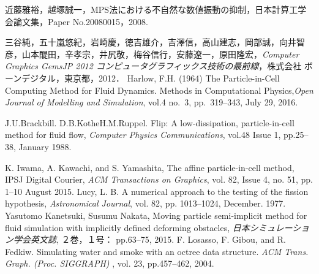 \documentclass[a4j,12pt]{jreport}
\begin{document}
\begin{thebibliography}{99}

近藤雅裕，越塚誠一，MPS法における不自然な数値振動の抑制，日本計算工学会論文集，Paper No.20080015，2008. 

三谷純，五十嵐悠紀，岩崎慶，徳吉雄介，吉澤信，高山建志，岡部誠，向井智彦，山本醍田，辛孝宗，井尻敬，梅谷信行，安藤遼一，原田隆宏，\textit{Computer Graphics GemsJP 2012 コンピュータグラフィックス技術の最前線}，株式会社 ボーンデジタル，東京都，2012．
Harlow, F.H.  (1964) The Particle-in-Cell Computing Method for Fluid Dynamics. Methods in Computational Physics,\textit{Open Journal of Modelling and Simulation},  vol.4 no.~3, pp.~319--343, July 29, 2016.

J.U.Brackbill. D.B.KotheH.M.Ruppel. Flip: A low-dissipation, particle-in-cell method for fluid flow, \textit{Computer Physics Communications}, vol.48 Issue 1, pp.25--38, January 1988.

K. Iwama, A. Kawachi, and S. Yamashita, The affine particle-in-cell method, IPSJ Digital Courier, \textit{ACM Transactions on Graphics}, vol. 82, Issue 4, no. 51, pp. 1--10 August 2015.
Lucy, L. B. A numerical approach to the testing of the fission hypothesis, \textit{Astronomical Journal}, vol. 82, pp. 1013--1024, December. 1977.
Yasutomo Kanetsuki, Susumu Nakata, Moving particle semi-implicit method for fluid simulation with implicitly defined deforming obstacles, \textit{日本シミュレーション学会英文誌}, ２巻，１号： pp.63--75, 2015.
F. Losasso, F. Gibou, and R. Fedkiw. Simulating water and smoke with an octree data structure. \textit{ACM Trans. Graph.  (Proc. SIGGRAPH) }, vol. 23, pp.457--462, 2004.
\end{thebibliography}

\end{document}

